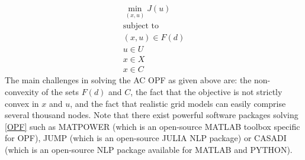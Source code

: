  \begin{subequations}
 \label{OPF}
 \begin{align}
 \min_{(x,u)} J(u)\\
 \mbox{subject to }\\
 (x,u)\in F(d)\\
 u\in U\\
 x\in X\\
 x\in C
 \end{align}
 \end{subequations}
 The main challenges in solving the AC OPF as given above are: the non-convexity of the sets $F(d)$ and 
$C$, the fact that the objective is not strictly convex in $x$ and $u$, and the fact that realistic grid models can easily comprise several thousand nodes.
Note that there exist powerful software packages solving \eqref{OPF} such as MATPOWER (which is an open-source MATLAB toolbox specific for OPF), JUMP  (which is an open-source JULIA NLP package) or CASADI (which is an open-source NLP package available for MATLAB and PYTHON). 


